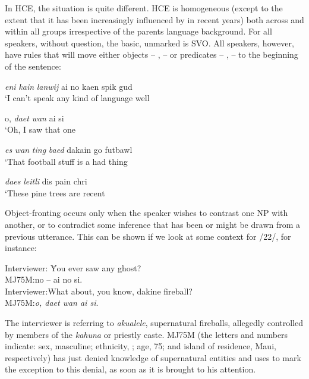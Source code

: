 In HCE, the situation is quite different. HCE is homogeneous (except to the extent that it has been increasingly influenced by  in recent years) both across and within all groups irrespective of the parents language background. For all speakers, without question, the basic, unmarked  is SVO. All speakers, however, have rules that will move either objects -- ,  -- or predicates -- ,  -- to the beginning of the sentence:



\ea\label{ex:21}
 \textit{eni} \textit{kain} \textit{lanwij} ai no kaen spik gud \\
\glt  `I can't speak any kind of language well
\z

\ea\label{ex:22}
 o, \textit{daet} \textit{wan} ai si\\
\glt  `Oh, I saw that one
\z

\ea\label{ex:23}
 \textit{es} \textit{wan} \textit{ting} \textit{baed} dakain go futbawl \\
\glt  `That football stuff is a had thing
\z

\ea\label{ex:24}
 \textit{daes} \textit{leitli} dis pain chri\\
\glt   `These pine trees are recent
\z

Object-fronting occurs only when the speaker wishes to contrast one NP with another, or to contradict some inference that has been or might be drawn from a previous utterance. This can be shown if we look at some context for /22/, for instance:

\ea\label{ex:25}
\begin{tabbing}
Interviewer: \= You ever saw any ghost?\\
MJ75M:\>no -- ai no si.\\
Interviewer:\>What about, you know, dakine fireball?\\
MJ75M:\>\textit{o, daet wan ai si}.
\end{tabbing}
\z

\noindent The interviewer is referring to \textit{akualele}, supernatural fireballs, allegedly controlled by members of the \textit{kahuna} or  priestly caste. MJ75M (the letters and numbers indicate: sex, masculine; ethnicity, ; age, 75; and island of residence, Maui, respectively) has just denied knowledge of supernatural entities and uses  to mark the exception to this denial, as soon as it is brought to his attention.

